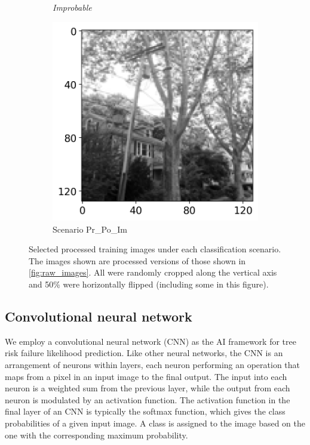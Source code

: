 \documentclass[Journal, letterpaper, DoubleSpace, InsideFigs]{ascelike-new}
\begin{document}
\begin{figure}[h!]
\begin{subfigure}[b]{.24\linewidth}
    \textit{\footnotesize Improbable}
    
    \includegraphics[width=\textwidth]{processed-improbable-example-2-flipped}
    \caption{Scenario Pr\_Po\_Im}
    \label{pr_po_im_64}
  \end{subfigure}%
  
  \caption{Selected processed training images under each classification scenario.
    The images shown are processed versions of those shown in \autoref{fig:raw_images}.
    All were randomly cropped along the vertical axis and 50\% were horizontally flipped (including some in this figure).
  }
  \label{fig:processed_images}
\end{figure}

\subsection{Convolutional neural network}
We employ a convolutional neural network (CNN) as the AI framework for tree risk failure likelihood prediction.  Like
other neural networks, the CNN is an arrangement of neurons within layers, each neuron performing an operation that maps
from a pixel in an input image to the final output.  The input into each neuron is a weighted sum from the previous
layer, while the output from each neuron is modulated by an activation function.  The activation function in the final
layer of an CNN is typically the softmax function, which gives the class probabilities of a given input image.  A class
is assigned to the image based on the one with the corresponding maximum probability.
\end{document}
